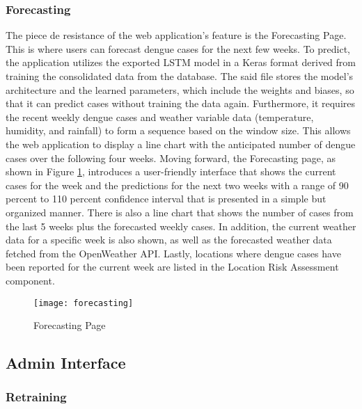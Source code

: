 \subsubsection{Forecasting}

The piece de resistance of the web application's feature is the Forecasting Page. This is where users can forecast dengue cases for the next few weeks. To predict, the application utilizes the exported LSTM model in a Keras format derived from training the consolidated data from the database. The said file stores the model's architecture and the learned parameters, which include the weights and biases, so that it can predict cases without training the data again.  Furthermore, it requires the recent weekly dengue cases and weather variable data (temperature, humidity, and rainfall) to form a sequence based on the window size. This allows the web application to display a line chart with the anticipated number of dengue cases over the following four weeks. Moving forward, the Forecasting page, as shown in Figure \ref{fig:forecasting}, introduces a user-friendly interface that shows the current cases for the week and the predictions for the next two weeks with a range of 90 percent to 110 percent confidence interval that is presented in a simple but organized manner. There is also a line chart that shows the number of cases from the last 5 weeks plus the forecasted weekly cases. In addition, the current weather data for a specific week is also shown, as well as the forecasted weather data fetched from the OpenWeather API. Lastly, locations where dengue cases have been reported for the current week are listed in the Location Risk Assessment component. 

\begin{figure}[H]
	\centering
	\texttt{[image: forecasting]}
	\caption{Forecasting Page}
	\label{fig:forecasting}
\end{figure}

\subsection{Admin Interface}

\subsubsection{Retraining}


